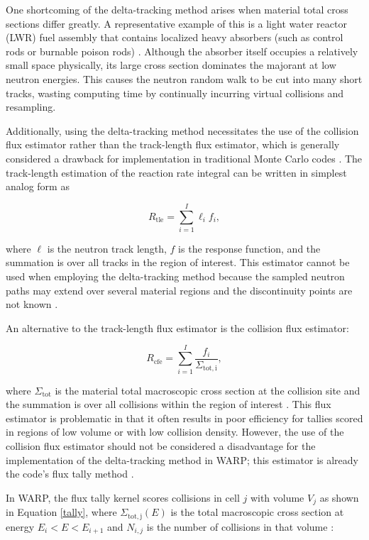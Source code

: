 One shortcoming of the delta-tracking method arises when material total cross sections differ greatly. A
representative example of this is a light water reactor (LWR) fuel assembly that contains localized heavy 
absorbers (such as control rods or burnable poison rods) \cite{serp_delta}. Although the absorber itself
occupies a relatively small space physically, its large cross section dominates the majorant at low 
neutron energies. This causes the neutron random walk to be cut into many short tracks, wasting computing
time by continually incurring virtual collisions and resampling. 

Additionally, using the delta-tracking method necessitates the use of the collision flux estimator rather 
than the track-length flux estimator, which is generally considered a drawback for implementation in 
traditional Monte Carlo codes \cite{serp_delta}. The track-length estimation of the reaction rate integral
can be written in simplest analog form as

\begin{equation}
R_{\mathrm{tle}} = \sum_{i=1}^{I}\ell_{i}f_{i},
\end{equation}

\noindent where $\ell$ is the neutron track length, $f$ is the response function, and the summation is 
over all tracks in the region of interest. This estimator cannot be used when employing the delta-tracking
method because the sampled neutron paths may extend over several material regions and the discontinuity
points are not known \cite{serp_delta}. 

An alternative to the track-length flux estimator is the collision flux estimator:

\begin{equation}
R_{\mathrm{cfe}} = \sum_{i=1}^{I}\frac{f_i}{\Sigma_{\mathrm{tot,i}}},
\end{equation}

\noindent where $\Sigma_{\mathrm{tot}}$ is the material total macroscopic cross section at the collision 
site and the summation is over all collisions within the region of interest \cite{serp_delta}. This flux 
estimator is problematic in that it often results in poor efficiency for tallies scored in regions of low 
volume or with low collision density. However, the use of the collision flux estimator should not be 
considered a disadvantage for the implementation of the delta-tracking method in WARP; this estimator is 
already the code's flux tally method \cite{warp2015}.

In WARP, the flux tally kernel scores collisions in cell $j$ with volume $V_j$ as shown in Equation 
\ref{tally}, where $\Sigma_{\mathrm{tot,j}}(E)$ is the total macroscopic cross section at energy 
$E_i < E < E_{i+1}$ and $N_{i,j}$ is the number of collisions in that volume \cite{warp2015}:

